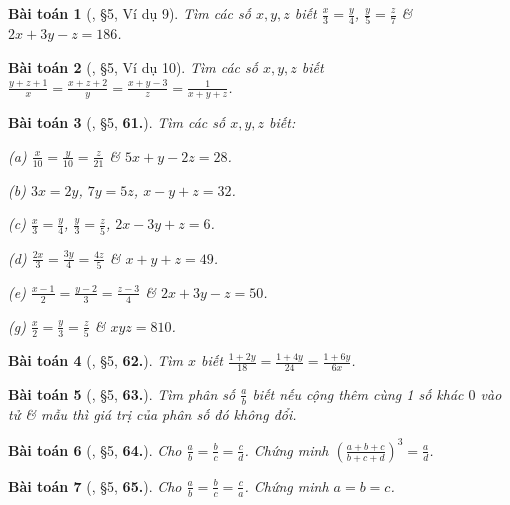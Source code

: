 \documentclass{article}
\numberwithin{equation}{section}
\newtheorem{baitoan}{Bài toán}[section]
\begin{document}
\begin{baitoan}[\cite{Binh_Toan_7_tap_1}, \S5, Ví dụ 9]
	Tìm các số $x,y,z$ biết $\frac{x}{3} = \frac{y}{4}$, $\frac{y}{5} = \frac{z}{7}$ \& $2x + 3y - z = 186$.
\end{baitoan}

\begin{baitoan}[\cite{Binh_Toan_7_tap_1}, \S5, Ví dụ 10]
	Tìm các số $x,y,z$ biết $\frac{y + z + 1}{x} = \frac{x + z + 2}{y} = \frac{x + y - 3}{z} = \frac{1}{x + y + z}$.
\end{baitoan}

\begin{baitoan}[\cite{Binh_Toan_7_tap_1}, \S5, \textbf{61.}]
	Tìm các số $x,y,z$ biết:
	\begin{enumerate*}
		\item[(a)] $\frac{x}{10} = \frac{y}{10} = \frac{z}{21}$ \& $5x + y - 2z = 28$.
		\item[(b)] $3x = 2y$, $7y = 5z$, $x - y + z = 32$.
		\item[(c)] $\frac{x}{3} = \frac{y}{4}$, $\frac{y}{3} = \frac{z}{5}$, $2x - 3y + z = 6$.
		\item[(d)] $\frac{2x}{3} = \frac{3y}{4} = \frac{4z}{5}$ \& $x + y + z = 49$.
		\item[(e)] $\frac{x - 1}{2} = \frac{y - 2}{3} = \frac{z - 3}{4}$ \& $2x + 3y - z = 50$.
		\item[(g)] $\frac{x}{2} = \frac{y}{3} = \frac{z}{5}$ \& $xyz = 810$.
	\end{enumerate*}
\end{baitoan}

\begin{baitoan}[\cite{Binh_Toan_7_tap_1}, \S5, \textbf{62.}]
	Tìm $x$ biết $\frac{1 + 2y}{18} = \frac{1 + 4y}{24} = \frac{1 + 6y}{6x}$.
\end{baitoan}

\begin{baitoan}[\cite{Binh_Toan_7_tap_1}, \S5, \textbf{63.}]
	Tìm phân số $\frac{a}{b}$ biết nếu cộng thêm cùng 1 số khác $0$ vào tử \& mẫu thì giá trị của phân số đó không đổi.
\end{baitoan}

\begin{baitoan}[\cite{Binh_Toan_7_tap_1}, \S5, \textbf{64.}]
	Cho $\frac{a}{b} = \frac{b}{c} = \frac{c}{d}$. Chứng minh $\left(\frac{a + b + c}{b + c + d}\right)^3 = \frac{a}{d}$.
\end{baitoan}

\begin{baitoan}[\cite{Binh_Toan_7_tap_1}, \S5, \textbf{65.}]
	Cho $\frac{a}{b} = \frac{b}{c} = \frac{c}{a}$. Chứng minh $a = b = c$.
\end{baitoan}
\end{document}
